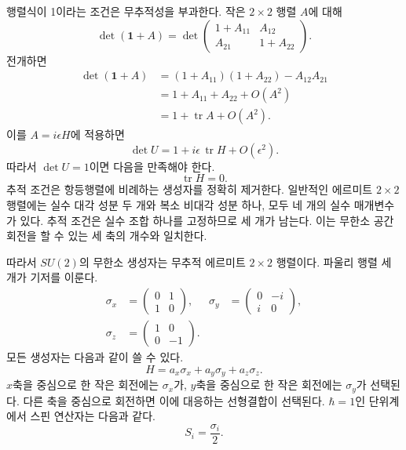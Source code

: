 행렬식이 1이라는 조건은 무추적성을 부과한다. 작은 \(2\times2\) 행렬 \(A\)에 대해
\begin{equation}
\det(\boldsymbol 1+A)
=
\det
\begin{pmatrix}
1+A_{11}&A_{12}\\
A_{21}&1+A_{22}
\end{pmatrix}.
\end{equation}
전개하면
\begin{align}
\det(\boldsymbol 1+A)
 &=(1+A_{11})(1+A_{22})-A_{12}A_{21}\\
 &=1+A_{11}+A_{22}+O(A^2)\\
 &=1+\operatorname{tr}A+O(A^2).
\end{align}
이를 \(A=i\epsilon H\)에 적용하면
\begin{equation}
\det U=1+i\epsilon\,\operatorname{tr}H+O(\epsilon^2).
\end{equation}
따라서 \(\det U=1\)이면 다음을 만족해야 한다.
\begin{equation}
\operatorname{tr}H=0.
\end{equation}
추적 조건은 항등행렬에 비례하는 생성자를 정확히 제거한다. 일반적인 에르미트 \(2\times2\) 행렬에는 실수 대각 성분 두 개와 복소 비대각 성분 하나, 모두 네 개의 실수 매개변수가 있다. 추적 조건은 실수 조합 하나를 고정하므로 세 개가 남는다. 이는 무한소 공간 회전을 할 수 있는 세 축의 개수와 일치한다.

따라서 \(SU(2)\)의 무한소 생성자는 무추적 에르미트 \(2\times2\) 행렬이다. 파울리 행렬 세 개가 기저를 이룬다.
\begin{equation}
\begin{aligned}
\sigma_x&=
\begin{pmatrix}0&1\\1&0\end{pmatrix},
&
\sigma_y&=
\begin{pmatrix}0&-i\\i&0\end{pmatrix},
\\[0.4em]
\sigma_z&=
\begin{pmatrix}1&0\\0&-1\end{pmatrix}.
\end{aligned}
\end{equation}
모든 생성자는 다음과 같이 쓸 수 있다.
\begin{equation}
H=a_x\sigma_x+a_y\sigma_y+a_z\sigma_z.
\end{equation}
\(x\)축을 중심으로 한 작은 회전에는 \(\sigma_x\)가, \(y\)축을 중심으로 한 작은 회전에는 \(\sigma_y\)가 선택된다. 다른 축을 중심으로 회전하면 이에 대응하는 선형결합이 선택된다. \(\hbar=1\)인 단위계에서 스핀 연산자는 다음과 같다.
\begin{equation}
S_i=\frac{\sigma_i}{2}.
\end{equation}

